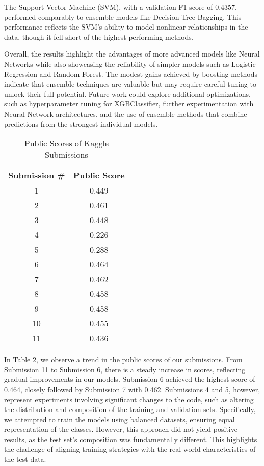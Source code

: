 \documentclass{article} %
\begin{document}
The Support Vector Machine (SVM), with a validation F1 score of 0.4357, performed comparably to ensemble models like Decision Tree Bagging. This performance reflects the SVM's ability to model nonlinear relationships in the data, though it fell short of the highest-performing methods.

Overall, the results highlight the advantages of more advanced models like Neural Networks while also showcasing the reliability of simpler models such as Logistic Regression and Random Forest. The modest gains achieved by boosting methods indicate that ensemble techniques are valuable but may require careful tuning to unlock their full potential. Future work could explore additional optimizations, such as hyperparameter tuning for XGBClassifier, further experimentation with Neural Network architectures, and the use of ensemble methods that combine predictions from the strongest individual models. 

\begin{table}[ht!]
   \centering
   \begin{tabular}{|c|c|}
       \hline
       \textbf{Submission \#} & \textbf{Public Score} \\ \hline
       1 & 0.449 \\ \hline
       2 & 0.461 \\ \hline
       3 & 0.448 \\ \hline
       4 & 0.226 \\ \hline
       5 & 0.288 \\ \hline
       6 & 0.464 \\ \hline
       7 & 0.462 \\ \hline
       8 & 0.458 \\ \hline
       9 & 0.458 \\ \hline
       10 & 0.455 \\ \hline
       11 & 0.436 \\ \hline
   \end{tabular}
   \caption{Public Scores of Kaggle Submissions}
   \label{tab:kaggle-scores}
\end{table}


In Table 2, we observe a trend in the public scores of our submissions. From Submission 11 to Submission 6, there is a steady increase in scores, reflecting gradual improvements in our models. Submission 6 achieved the highest score of 0.464, closely followed by Submission 7 with 0.462. Submissions 4 and 5, however, represent experiments involving significant changes to the code, such as altering the distribution and composition of the training and validation sets. Specifically, we attempted to train the models using balanced datasets, ensuring equal representation of the classes. However, this approach did not yield positive results, as the test set's composition was fundamentally different. This highlights the challenge of aligning training strategies with the real-world characteristics of the test data.
\end{document}
